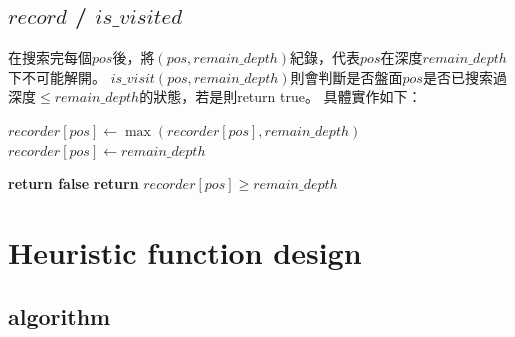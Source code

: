 \documentclass[a4paper, 12pt]{article}  %
\begin{document}
\subsection{$record$ / $is\_visited$}
在搜索完每個$pos$後，將$(pos, remain\_depth)$紀錄，代表$pos$在深度$remain\_depth$下不可能解開。
$is\_visit(pos, remain\_depth)$則會判斷是否盤面$pos$是否已搜索過深度$\le remain\_depth$的狀態，若是則return true。
具體實作如下：

\begin{algorithm}
    \begin{algorithmic}
                \State$recorder[pos] \gets \max(recorder[pos], remain\_depth)$
            \Else
                \State $recorder[pos] \gets remain\_depth$
            \EndIf
        \EndProcedure

                \textbf{return false}
            \Else
                \textbf{ return} $recorder[pos] \ge remain\_depth$
            \EndIf
        \EndProcedure
    \end{algorithmic}
\end{algorithm}






\newpage
\section{Heuristic function design}

\subsection{algorithm}
\end{document}
